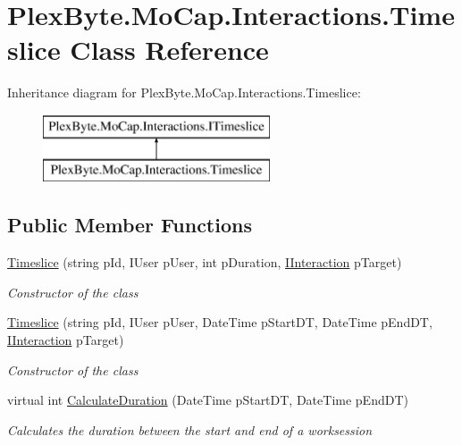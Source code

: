 \hypertarget{class_plex_byte_1_1_mo_cap_1_1_interactions_1_1_timeslice}{}\section{Plex\+Byte.\+Mo\+Cap.\+Interactions.\+Timeslice Class Reference}
\label{class_plex_byte_1_1_mo_cap_1_1_interactions_1_1_timeslice}
Inheritance diagram for Plex\+Byte.\+Mo\+Cap.\+Interactions.\+Timeslice\+:\begin{figure}[H]
\begin{center}
\leavevmode
\includegraphics[height=2.000000cm]{class_plex_byte_1_1_mo_cap_1_1_interactions_1_1_timeslice}
\end{center}
\end{figure}
\subsection*{Public Member Functions}
\begin{DoxyCompactItemize}
\item 
\hyperlink{class_plex_byte_1_1_mo_cap_1_1_interactions_1_1_timeslice_ad175821da92a167c2aa6beb22e43b9bd}{Timeslice} (string p\+Id, I\+User p\+User, int p\+Duration, \hyperlink{interface_plex_byte_1_1_mo_cap_1_1_interactions_1_1_i_interaction}{I\+Interaction} p\+Target)
\begin{DoxyCompactList}\small\item\em Constructor of the class \end{DoxyCompactList}\item 
\hyperlink{class_plex_byte_1_1_mo_cap_1_1_interactions_1_1_timeslice_a2a40266754a890b0a0ab13c0a1908b0d}{Timeslice} (string p\+Id, I\+User p\+User, Date\+Time p\+Start\+DT, Date\+Time p\+End\+DT, \hyperlink{interface_plex_byte_1_1_mo_cap_1_1_interactions_1_1_i_interaction}{I\+Interaction} p\+Target)
\begin{DoxyCompactList}\small\item\em Constructor of the class \end{DoxyCompactList}\item 
virtual int \hyperlink{class_plex_byte_1_1_mo_cap_1_1_interactions_1_1_timeslice_acf019f3b3bfe9c64fc32d78e45c41f8a}{Calculate\+Duration} (Date\+Time p\+Start\+DT, Date\+Time p\+End\+DT)
\begin{DoxyCompactList}\small\item\em Calculates the duration between the start and end of a worksession \end{DoxyCompactList}\end{DoxyCompactItemize}
